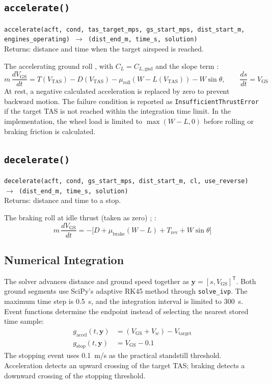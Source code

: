 \documentclass[11pt,letterpaper]{article}
\numberwithin{equation}{section}
\newcommand{\func}[2]{\begin{funcbox}\texttt{#1}\\[2pt]{\color{ink3}Returns:} #2\end{funcbox}}
\newcommand{\code}[1]{\textmd{\texttt{#1}}}
\begin{document}
\subsection{\code{accelerate()}}
\func{accelerate(acft, cond, tas\_target\_mps, gs\_start\_mps, dist\_start\_m, engines\_operating) $\rightarrow$ (dist\_end\_m, time\_s, solution)}{distance and time when the target airspeed is reached.}
The accelerating ground roll \cite[Ch.~6]{ANDERSON-APD}, with $C_L = C_{L,\text{gnd}}$ and the slope term \cite{OJHA}:
\begin{equation}
m\,\frac{dV_\text{GS}}{dt} = T(V_\text{TAS}) - D(V_\text{TAS}) - \mu_\text{roll}\left(W - L(V_\text{TAS})\right) - W\sin\theta,
\qquad \frac{ds}{dt} = V_\text{GS} \label{eq:eom-accel}
\end{equation}
At rest, a negative calculated acceleration is replaced by zero to prevent backward motion. The failure condition is reported as \code{InsufficientThrustError} if the target TAS is not reached within the integration time limit. In the implementation, the wheel load is limited to $\max(W-L,0)$ before rolling or braking friction is calculated.

\subsection{\code{decelerate()}}
\func{decelerate(acft, cond, gs\_start\_mps, dist\_start\_m, cl, use\_reverse) $\rightarrow$ (dist\_end\_m, time\_s, solution)}{distance and time to a stop.}
The braking roll at idle thrust (taken as zero) \cite[Ch.~6]{ANDERSON-APD}; \cite[Ch.~17]{RAYMER}:
\begin{equation}
m\,\frac{dV_\text{GS}}{dt} = -\Big[D + \mu_\text{brake}\left(W - L\right) + T_\text{rev} + W\sin\theta\Big] \label{eq:eom-brake}
\end{equation}

\subsection{Numerical Integration}
The solver advances distance and ground speed together as $\mathbf{y}=[s,V_\text{GS}]^\mathsf{T}$. Both ground segments use SciPy's adaptive RK45 method through \code{solve\_ivp}. The maximum time step is \SI{0.5}{s}, and the integration interval is limited to \SI{300}{s}. Event functions determine the endpoint instead of selecting the nearest stored time sample:
\begin{align}
g_\text{accel}(t,\mathbf{y}) &= \left(V_\text{GS} + V_w\right) - V_\text{target} \label{eq:event-accel}\\
g_\text{stop}(t,\mathbf{y}) &= V_\text{GS} - 0.1 \label{eq:event-stop}
\end{align}
The stopping event uses \SI{0.1}{m/s} as the practical standstill threshold. Acceleration detects an upward crossing of the target TAS; braking detects a downward crossing of the stopping threshold.
\end{document}
